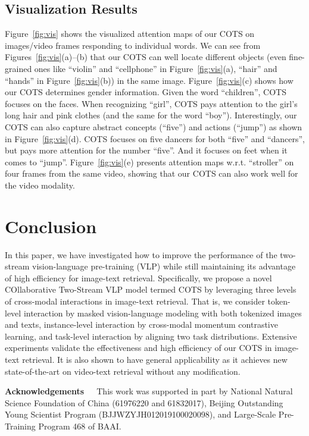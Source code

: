 \documentclass[10pt,twocolumn,letterpaper]{article}
\begin{document}
\subsection{Visualization Results}

Figure~\ref{fig:vis} shows the visualized attention maps of our COTS on images/video frames responding to individual words. We can see from Figures~\ref{fig:vis}(a)--(b) that our COTS can well locate different objects (even fine-grained ones like ``violin'' and ``cellphone'' in Figure~\ref{fig:vis}(a), ``hair'' and ``hands'' in Figure~\ref{fig:vis}(b)) in the same image. Figure~\ref{fig:vis}(c) shows how our COTS determines gender information. Given the word ``children'', COTS focuses on the faces. When recognizing ``girl'', COTS pays attention to the girl's long hair and pink clothes (and the same for the word ``boy''). Interestingly, our COTS can also capture abstract concepts (``five'') and actions (``jump'') as shown in Figure~\ref{fig:vis}(d). COTS focuses on five dancers for both ``five'' and ``dancers'', but pays more attention for the number ``five''. And it focuses on feet when it comes to ``jump''. Figure~\ref{fig:vis}(e) presents attention maps w.r.t. ``stroller'' on four frames from the same video, showing that our COTS can also work well for the video modality.

 
\section{Conclusion}
 
In this paper, we have investigated how to improve the performance of the two-stream vision-language pre-training (VLP) while still maintaining its advantage of high efficiency for image-text retrieval. Specifically, we propose a novel COllaborative Two-Stream VLP model termed COTS by leveraging three levels of cross-modal interactions in image-text retrieval. That is, we consider token-level interaction by masked vision-language modeling with both tokenized images and texts, instance-level interaction by cross-modal momentum contrastive learning, and task-level interaction by aligning two task distributions. Extensive experiments validate the effectiveness and high efficiency of our COTS in image-text retrieval. It is also shown to have general applicability as it achieves new state-of-the-art on video-text retrieval without any modification.

{\noindent\textbf{Acknowledgements}~~~This work was supported in part by National Natural Science Foundation of China (61976220 and 61832017), Beijing Outstanding Young Scientist Program (BJJWZYJH012019100020098), and Large-Scale Pre-Training Program 468 of BAAI.
}

{\small


}
\end{document}

